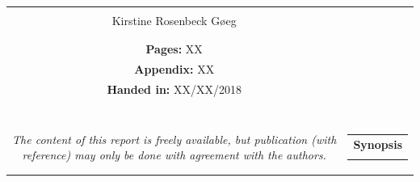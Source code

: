 \begin{titlepage}
\begin{nopagebreak}
{\begin{tabular}{cc}
{{\textbf{Supervisor:}\\
Kirstine Rosenbeck Gøeg 

}\\
\\
\\
\textbf{Pages:} XX \\
\textbf{Appendix:} XX \\
\textbf{Handed in:} XX/XX/2018\\
\\
\\
\\
\\
\\
\textit{The content of this report is freely available, but publication (with reference) may only be done with
	agreement with the authors.}
\vfill } &
\parbox{7cm}{
  \vspace{.15cm}
  \hfill
  \begin{tabular}{l}
  {\textbf{Synopsis}}\bigskip \\
  \fbox{
    \parbox{7cm}{\bigskip
     {\vfill{\small 
     \bigskip}}
     }}
   \end{tabular}}
\end{tabular}} %


\end{nopagebreak}
\end{titlepage}
%